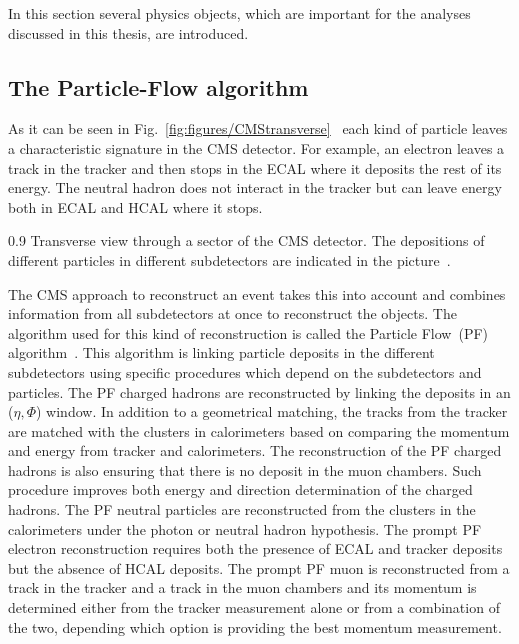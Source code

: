 
In this section several physics objects, which are important for the analyses discussed in this thesis, are introduced.


\subsection{The Particle-Flow algorithm}

As it can be seen in Fig.~\ref{fig:figures/CMStransverse}~\cite{Sirunyan:2017ulk} each kind of particle leaves a characteristic signature in the CMS detector. For example, an electron leaves a track in the tracker and then stops in the ECAL where it deposits the rest of its energy. The neutral hadron does not interact in the tracker but can leave energy both in ECAL and  HCAL where it stops.

                 {0.9}       %
                 { Transverse view through a sector of the CMS detector. The depositions of different particles in different subdetectors are indicated in the picture~\cite{Sirunyan:2017ulk}. }

The CMS approach to reconstruct an event takes this into account and combines information from all subdetectors at once to reconstruct the objects. The algorithm used for this kind of reconstruction is called the Particle Flow~(PF) algorithm~\cite{Sirunyan:2017ulk}. This algorithm is linking particle deposits in the different subdetectors using specific procedures which depend on the subdetectors and particles. The PF charged hadrons are reconstructed by linking the deposits in an ($\eta,\Phi$) window. In addition to a geometrical matching, the tracks from the tracker are matched with the clusters in calorimeters based on comparing the momentum and energy from tracker and calorimeters. The reconstruction of the PF charged hadrons is also ensuring that there is no deposit in the muon chambers. Such procedure improves both energy and direction determination of the charged hadrons. The PF neutral particles are reconstructed from the clusters in the calorimeters under the photon or neutral hadron hypothesis. The prompt PF electron reconstruction requires both the presence of  ECAL and tracker deposits but the absence of HCAL deposits. The prompt PF muon is reconstructed from a track in the tracker and a track in the muon chambers and its momentum is determined either from the tracker measurement alone or from a combination of the two, depending which option is providing the best momentum measurement.

